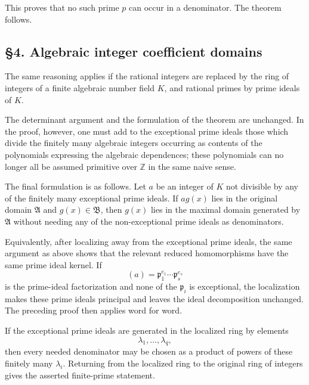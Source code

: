 This proves that no such prime \(p\) can occur in a denominator. The
theorem follows.

\subsection{§4. Algebraic integer coefficient
domains}\label{algebraic-integer-coefficient-domains}

The same reasoning applies if the rational integers are replaced by the
ring of integers of a finite algebraic number field \(K\), and rational
primes by prime ideals of \(K\).

The determinant argument and the formulation of the theorem are
unchanged. In the proof, however, one must add to the exceptional prime
ideals those which divide the finitely many algebraic integers occurring
as contents of the polynomials expressing the algebraic dependences;
these polynomials can no longer all be assumed primitive over
\(\mathbb Z\) in the same naive sense.

The final formulation is as follows. Let \(a\) be an integer of \(K\)
not divisible by any of the finitely many exceptional prime ideals. If
\(a g(x)\) lies in the original domain \(\mathfrak A\) and
\(g(x)\in\mathfrak B\), then \(g(x)\) lies in the maximal domain
generated by \(\mathfrak A\) without needing any of the non-exceptional
prime ideals as denominators.

Equivalently, after localizing away from the exceptional prime ideals,
the same argument as above shows that the relevant reduced homomorphisms
have the same prime ideal kernel. If \[
  (a)=\mathfrak p_1^{e_1}\cdots\mathfrak p_s^{e_s}
\] is the prime-ideal factorization and none of the \(\mathfrak p_i\) is
exceptional, the localization makes these prime ideals principal and
leaves the ideal decomposition unchanged. The preceding proof then
applies word for word.

If the exceptional prime ideals are generated in the localized ring by
elements \[
  \lambda_1,
\ldots,
\lambda_q,
\] then every needed denominator may be chosen as a product of powers of
these finitely many \(\lambda_i\). Returning from the localized ring to
the original ring of integers gives the asserted finite-prime statement.

\newpage

